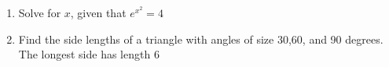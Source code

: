 \documentclass{article}
\begin{document}
\begin{enumerate}
    \item Solve for $x$, given that $e^{x^2} = 4$
    \item Find the side lengths of a triangle with angles of size 30,60, and 90 degrees. 
    The longest side has length 6
\end{enumerate}
\end{document}
